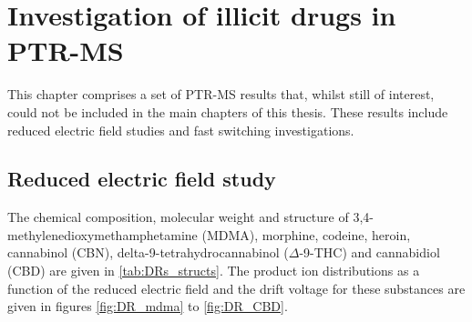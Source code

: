 \chapter{Investigation of illicit drugs in PTR-MS}\label{chapter:drugs}

This chapter comprises a set of PTR-MS results that, whilst still of interest, could not be included in the main chapters of this thesis.
%
These results include reduced electric field studies and fast switching investigations.


\section{Reduced electric field study}
The chemical composition, molecular weight and structure of 
3,4-methylenedioxymethamphetamine (MDMA),
morphine, 
codeine, 
heroin, 
cannabinol (CBN), 
delta-9-tetrahydrocannabinol ($\Delta$-9-THC)
and 
cannabidiol (CBD)
are given in \autoref{tab:DRs_structs}.
%
The product ion distributions as a function of the reduced electric field and the drift voltage for these substances are given in  figures \ref{fig:DR_mdma} to \ref{fig:DR_CBD}.






